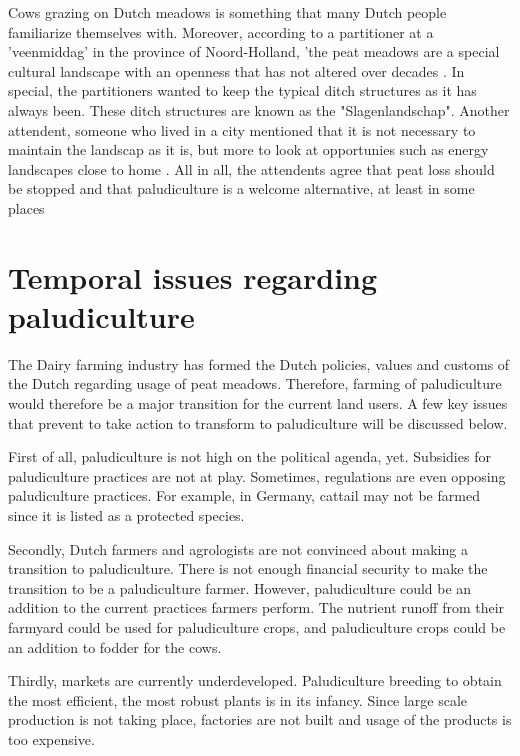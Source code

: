 {\begin{enumerate}
Cows grazing on Dutch meadows is something that many Dutch people familiarize themselves with. Moreover, according to a partitioner at a 'veenmiddag' in the province of Noord-Holland, 'the peat meadows are a special cultural landscape with an openness that has not altered over decades \citep{Dosker2017}. In special, the partitioners wanted to keep the typical ditch structures as it has always been. These ditch structures are known as the "Slagenlandschap". Another attendent, someone who lived in a city mentioned that it is not necessary to maintain the landscap as it is, but more to look at opportunies such as energy landscapes close to home \citep{Dosker2017}. All in all, the attendents agree that peat loss should be stopped and that paludiculture is a welcome alternative, at least in some places \citep{Dosker2017}


\section{Temporal issues regarding paludiculture}

The Dairy farming industry has formed the Dutch policies, values and customs of the Dutch regarding usage of peat meadows. Therefore, farming of paludiculture would therefore be a major transition for the current land users. A few key issues that prevent to take action to transform to paludiculture will be discussed below.

First of all, paludiculture is not high on the political agenda, yet. Subsidies for paludiculture practices are not at play. Sometimes, regulations are even opposing paludiculture practices. For example, in Germany, cattail may not be farmed since it is listed as a protected species. 

Secondly, Dutch farmers and agrologists are not convinced about making a transition to paludiculture. There is not enough financial security to make the transition to be a paludiculture farmer. However, paludiculture could be an addition to the current practices farmers perform. The nutrient runoff from their farmyard could be used for paludiculture crops, and paludiculture crops could be an addition to fodder for the cows. 

Thirdly, markets are currently underdeveloped. Paludiculture breeding to obtain the most efficient, the most robust plants is in its infancy. Since large scale production is not taking place, factories are not built and usage of the products is too expensive. 


\end{enumerate}}
